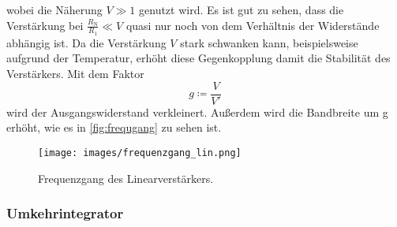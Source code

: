             wobei die Näherung $V\gg 1$ genutzt wird. Es ist gut zu sehen, dass die Verstärkung bei $\frac{R_\text{N}}{R_1} \ll V$ quasi nur noch 
            von dem Verhältnis der Widerstände abhängig ist. 
            Da die Verstärkung $V$ stark schwanken kann, beispielsweise aufgrund der Temperatur, erhöht diese Gegenkopplung damit die Stabilität des Verstärkers. 
            Mit dem Faktor 
            \begin{equation*}
                g \coloneq \frac{V}{V'}
            \end{equation*}
            wird der Ausgangswiderstand verkleinert.
            Außerdem wird die Bandbreite um g erhöht, wie es in \autoref{fig:frequgang} zu sehen ist. 
            \begin{figure}[H]
                \centering
                \texttt{[image: images/frequenzgang\_lin.png]}
                \caption{Frequenzgang des Linearverstärkers. \cite{V51_old}}
                \label{fig:frequgang}
            \end{figure}

        \subsubsection{Umkehrintegrator}


